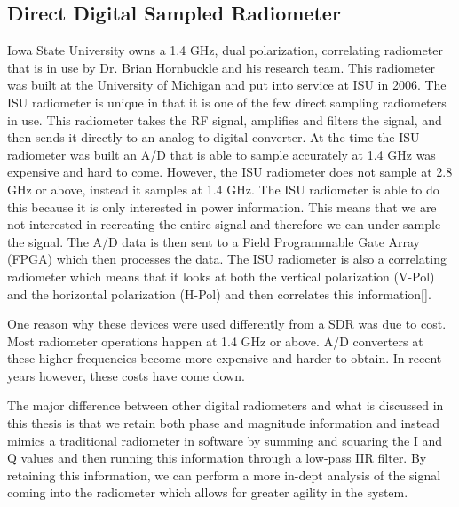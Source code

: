 \subsection{Direct Digital Sampled Radiometer}  
Iowa State University owns a 1.4 GHz, dual polarization, correlating radiometer that is in use by Dr. Brian Hornbuckle and his research team.  This radiometer was built at the University of Michigan and put into service at ISU in 2006.  The ISU radiometer is unique in that it is one of the few direct sampling radiometers in use\cite{Erbas}.  This radiometer takes the RF signal, amplifies and filters the signal, and then sends it directly to an analog to digital converter.  At the time the ISU radiometer was built an A/D that is able to sample accurately at 1.4 GHz was expensive and hard to come.  However, the ISU radiometer does not sample at 2.8 GHz or above, instead it samples at 1.4 GHz.  The ISU radiometer is able to do this because it is only interested in power information.  This means that we are not interested in recreating the entire signal and therefore we can under-sample the signal.  The A/D data is then sent to a Field Programmable Gate Array (FPGA) which then processes the data.  The ISU radiometer is also a correlating radiometer which means that it looks at both the vertical polarization (V-Pol) and the horizontal polarization (H-Pol) and then correlates this information[\cite{Fischman2001}]. 

One reason why these devices were used differently from a SDR was due to cost.  Most radiometer operations happen at 1.4 GHz or above.  A/D converters at these higher frequencies become more expensive and harder to obtain.  In recent years however, these costs have come down.

The major difference between other digital radiometers and what is discussed in this thesis is that we retain both phase and magnitude information and instead mimics a traditional radiometer in software by summing and squaring the I and Q values and then running this information through a low-pass IIR filter.  By retaining this information, we can perform a more in-dept analysis of the signal coming into the radiometer which allows for greater agility in the system.



